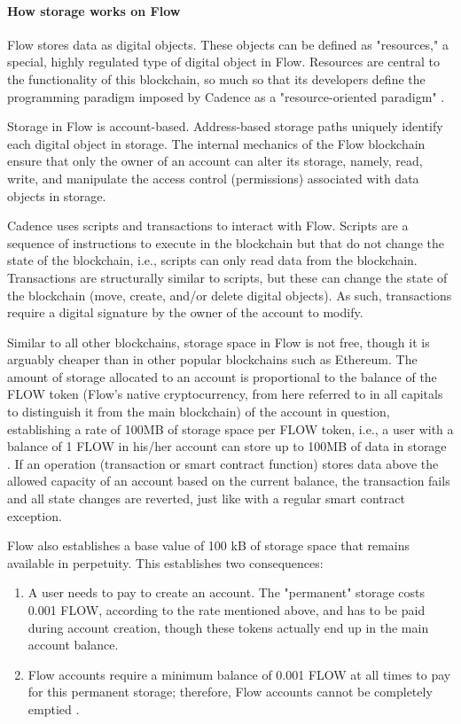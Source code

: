 \documentclass[./4_GeneralApproach.tex]{subfiles}
\begin{document}
\paragraph{How storage works on Flow}
Flow stores data as digital objects. These objects can be defined as "resources," a special, highly regulated type of digital object in Flow. Resources are central to the functionality of this blockchain, so much so that its developers define the programming paradigm imposed by Cadence as a "resource-oriented paradigm" \cite{flow2024}.
\par
Storage in Flow is account-based. Address-based storage paths uniquely identify each digital object in storage. The internal mechanics of the Flow blockchain ensure that only the owner of an account can alter its storage, namely, read, write, and manipulate the access control (permissions) associated with data objects in storage.
\par
Cadence uses scripts and transactions to interact with Flow. Scripts are a sequence of instructions to execute in the blockchain but that do not change the state of the blockchain, i.e., scripts can only read data from the blockchain. Transactions are structurally similar to scripts, but these can change the state of the blockchain (move, create, and/or delete digital objects). As such, transactions require a digital signature by the owner of the account to modify.
\par
Similar to all other blockchains, storage space in Flow is not free, though it is arguably cheaper than in other popular blockchains such as Ethereum. The amount of storage allocated to an account is proportional to the balance of the FLOW token (Flow's native cryptocurrency, from here referred to in all capitals to distinguish it from the main blockchain) of the account in question, establishing a rate of 100MB of storage space per FLOW token, i.e., a user with a balance of 1 FLOW in his/her account can store up to 100MB of data in storage \cite{flow2024}. If an operation (transaction or smart contract function) stores data above the allowed capacity of an account based on the current balance, the transaction fails and all state changes are reverted, just like with a regular smart contract exception.
\par
Flow also establishes a base value of 100 kB of storage space that remains available in perpetuity. This establishes two consequences:

\begin{enumerate}
    \item {A user needs to pay to create an account. The "permanent" storage costs 0.001 FLOW, according to the rate mentioned above, and has to be paid during account creation, though these tokens actually end up in the main account balance.}
    \item {Flow accounts require a minimum balance of 0.001 FLOW at all times to pay for this permanent storage; therefore, Flow accounts cannot be completely emptied \cite{flow2024}.}
\end{enumerate}
\end{document}
